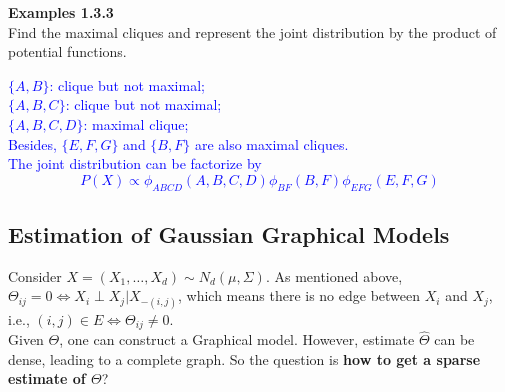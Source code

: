 \documentclass[12pt]{book}
\theoremstyle{definition}
\theoremstyle{remark}
\begin{document}
\textbf{Examples 1.3.3}\\
Find the maximal cliques and represent the joint distribution by the product of potential functions.\\


\begin{center}
\end{center}
\textcolor{blue}{
$\{A,B\}$: clique but not maximal;\\
$\{A, B, C\}$: clique but not maximal;\\
$\{A, B, C, D\}$: maximal clique;\\
Besides, $\{E, F, G\}$ and $\{B, F\}$ are also maximal cliques.\\
The joint distribution can be factorize by 
\[P(X) \propto \phi_{ABCD}(A, B, C, D)\phi_{BF}(B, F)\phi_{EFG}(E, F, G)\]
}

\subsection{Estimation of Gaussian Graphical Models}
Consider $X = (X_1, \dots , X_d) \sim N_d(\mu, \Sigma)$. As mentioned above, $\Theta_{ij} = 0 \Leftrightarrow X_i \perp X_j | X_{-(i,j)}$, which means there is no edge between $X_i$ and $X_j$, i.e., $(i,j) \in E \Leftrightarrow \Theta_{ij} \ne 0$. \\Given $\Theta$, one can construct a Graphical model. However, estimate $\hat{\Theta}$ can be dense, leading to a complete graph. So the question is \textbf{how to get a sparse estimate of $\Theta$}?
\end{document}
